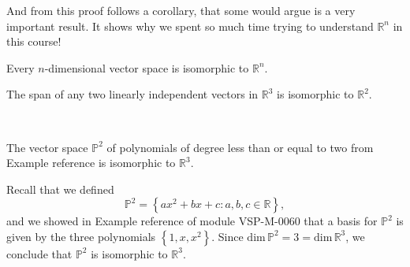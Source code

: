 \documentclass{ximera}
\newcommand{\RR}{\mathbb{R}}
\begin{document}
And from this proof follows a corollary, that some would argue is a very important result.  It shows why we spent so much time trying to understand $\RR^n$ in this course!

\begin{corollary}\label{cor:ndimisotorn}
Every $n$-dimensional vector space is isomorphic to $\RR^n$.
\end{corollary}

\begin{example}
The span of any two linearly independent vectors in $\RR^3$ is isomorphic to $\RR^2$. %


\begin{center}
~~~~~~~~~~~~~
  \label{fig:planeisoplane} 
  \end{center}

\end{example}

\begin{example}
The vector space $\mathbb{P}^2$ of polynomials of degree less than or equal to two from Example {\color{red} reference} is isomorphic to $\RR^3$.
\end{example}

\begin{explanation}
Recall that we defined $$\mathbb{P}^2=\left\{ax^2+bx+c : a,b,c \in \mathbb{R} \right\},$$ and we showed in Example {\color{red} reference} of module VSP-M-0060 that a basis for $\mathbb{P}^2$ is given by the three polynomials $\left\{1,x,x^2\right\}$.  Since $\text{dim}\,\mathbb{P}^2=3=\text{dim}\,\RR^3$, we conclude that $\mathbb{P}^2$ is isomorphic to $\RR^3$.
\end{explanation}
\end{document}
